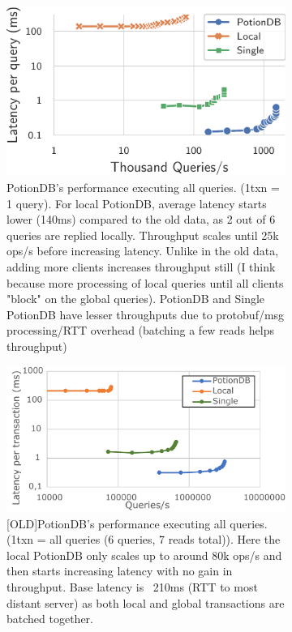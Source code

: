 \documentclass[sigplan,10pt]{acmart}
\begin{document}
\begin{figure}[h]
	\centering
	\begin{subfigure}{.47\linewidth}
		\includegraphics[width=1\linewidth]{singleQuery/all_queries_tc}
		\caption{PotionDB's performance executing all queries. (1txn = 1 query). For local PotionDB, average latency starts lower (140ms) compared to the old data, as 2 out of 6 queries are replied locally. Throughput scales until 25k ops/s before increasing latency. Unlike in the old data, adding more clients increases throughput still (I think because more processing of local queries until all clients "block" on the global queries). PotionDB and Single PotionDB have lesser throughputs due to protobuf/msg processing/RTT overhead (batching a few reads helps throughput)}
		\label{fig:(new)global_local_single_tc}
	\end{subfigure}%
	\hspace*{3em}
	\begin{subfigure}{.47\linewidth}
		\includegraphics[width=1\linewidth]{clientScale_tc_cut}
		\caption{[OLD]PotionDB's performance executing all queries. (1txn = all queries (6 queries, 7 reads total)). Here the local PotionDB only scales up to around 80k ops/s and then starts increasing latency with no gain in throughput. Base latency is ~210ms (RTT to most distant server) as both local and global transactions are batched together.}
		\label{fig:(old)global_local_single_tc}
	\end{subfigure}
	\caption{}
\end{figure}
\end{document}
